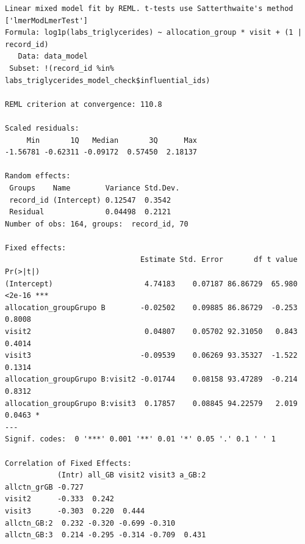 \documentclass[
  12pt,
]{article}
\newenvironment{Shaded}{\begin{snugshade}}{\end{snugshade}}
\newcommand{\NormalTok}[1]{\textcolor[rgb]{0.00,0.23,0.31}{#1}}
\newcommand{\SpecialCharTok}[1]{\textcolor[rgb]{0.37,0.37,0.37}{#1}}
\begin{document}
\begin{verbatim}
Linear mixed model fit by REML. t-tests use Satterthwaite's method ['lmerModLmerTest']
Formula: log1p(labs_triglycerides) ~ allocation_group * visit + (1 | record_id)
   Data: data_model
 Subset: !(record_id %in% labs_triglycerides_model_check$influential_ids)

REML criterion at convergence: 110.8

Scaled residuals: 
     Min       1Q   Median       3Q      Max 
-1.56781 -0.62311 -0.09172  0.57450  2.18137 

Random effects:
 Groups    Name        Variance Std.Dev.
 record_id (Intercept) 0.12547  0.3542  
 Residual              0.04498  0.2121  
Number of obs: 164, groups:  record_id, 70

Fixed effects:
                               Estimate Std. Error       df t value Pr(>|t|)    
(Intercept)                     4.74183    0.07187 86.86729  65.980   <2e-16 ***
allocation_groupGrupo B        -0.02502    0.09885 86.86729  -0.253   0.8008    
visit2                          0.04807    0.05702 92.31050   0.843   0.4014    
visit3                         -0.09539    0.06269 93.35327  -1.522   0.1314    
allocation_groupGrupo B:visit2 -0.01744    0.08158 93.47289  -0.214   0.8312    
allocation_groupGrupo B:visit3  0.17857    0.08845 94.22579   2.019   0.0463 *  
---
Signif. codes:  0 '***' 0.001 '**' 0.01 '*' 0.05 '.' 0.1 ' ' 1

Correlation of Fixed Effects:
            (Intr) all_GB visit2 visit3 a_GB:2
allctn_grGB -0.727                            
visit2      -0.333  0.242                     
visit3      -0.303  0.220  0.444              
allctn_GB:2  0.232 -0.320 -0.699 -0.310       
allctn_GB:3  0.214 -0.295 -0.314 -0.709  0.431
\end{verbatim}

\begin{Shaded}
\end{Shaded}
\end{document}
